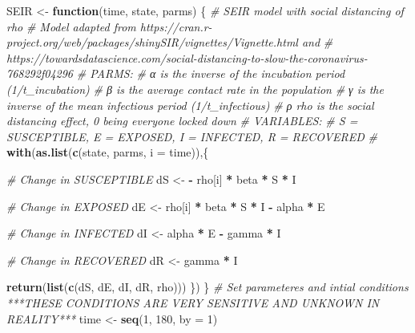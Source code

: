 \documentclass[]{article}
\newenvironment{Shaded}{\begin{snugshade}}{\end{snugshade}}
\newcommand{\KeywordTok}[1]{\textcolor[rgb]{0.13,0.29,0.53}{\textbf{#1}}}
\newcommand{\DataTypeTok}[1]{\textcolor[rgb]{0.13,0.29,0.53}{#1}}
\newcommand{\DecValTok}[1]{\textcolor[rgb]{0.00,0.00,0.81}{#1}}
\newcommand{\StringTok}[1]{\textcolor[rgb]{0.31,0.60,0.02}{#1}}
\newcommand{\CommentTok}[1]{\textcolor[rgb]{0.56,0.35,0.01}{\textit{#1}}}
\newcommand{\ControlFlowTok}[1]{\textcolor[rgb]{0.13,0.29,0.53}{\textbf{#1}}}
\newcommand{\OperatorTok}[1]{\textcolor[rgb]{0.81,0.36,0.00}{\textbf{#1}}}
\newcommand{\NormalTok}[1]{#1}
\begin{document}
\begin{Shaded}
\begin{Highlighting}[]
\NormalTok{SEIR <-}\StringTok{ }\ControlFlowTok{function}\NormalTok{(time, state, parms) \{}
  \CommentTok{# SEIR model with social distancing of rho}
  \CommentTok{# Model adapted from https://cran.r-project.org/web/packages/shinySIR/vignettes/Vignette.html and}
  \CommentTok{# https://towardsdatascience.com/social-distancing-to-slow-the-coronavirus-768292f04296}
  \CommentTok{# PARMS:}
  \CommentTok{# α is the inverse of the incubation period (1/t_incubation)}
  \CommentTok{# β is the average contact rate in the population}
  \CommentTok{# γ is the inverse of the mean infectious period (1/t_infectious)}
  \CommentTok{# ρ rho is the social distancing effect, 0 being everyone locked down}
  \CommentTok{# VARIABLES:}
  \CommentTok{# S = SUSCEPTIBLE, E = EXPOSED, I = INFECTED, R = RECOVERED}
  \CommentTok{# }
    \KeywordTok{with}\NormalTok{(}\KeywordTok{as.list}\NormalTok{(}\KeywordTok{c}\NormalTok{(state, parms, }\DataTypeTok{i =}\NormalTok{ time)),\{}
      
        \CommentTok{# Change in SUSCEPTIBLE}
\NormalTok{        dS <-}\StringTok{ }\OperatorTok{-}\StringTok{ }\NormalTok{rho[i] }\OperatorTok{*}\StringTok{ }\NormalTok{beta }\OperatorTok{*}\StringTok{ }\NormalTok{S }\OperatorTok{*}\StringTok{ }\NormalTok{I }
        
        \CommentTok{# Change in EXPOSED}
\NormalTok{        dE <-}\StringTok{ }\NormalTok{rho[i] }\OperatorTok{*}\StringTok{ }\NormalTok{beta }\OperatorTok{*}\StringTok{ }\NormalTok{S }\OperatorTok{*}\StringTok{ }\NormalTok{I }\OperatorTok{-}\StringTok{ }\NormalTok{alpha }\OperatorTok{*}\StringTok{ }\NormalTok{E}
        
        \CommentTok{# Change in INFECTED}
\NormalTok{        dI <-}\StringTok{ }\NormalTok{alpha }\OperatorTok{*}\StringTok{ }\NormalTok{E }\OperatorTok{-}\StringTok{ }\NormalTok{gamma }\OperatorTok{*}\StringTok{ }\NormalTok{I}
        
        \CommentTok{# Change in RECOVERED}
\NormalTok{        dR <-}\StringTok{ }\NormalTok{gamma }\OperatorTok{*}\StringTok{ }\NormalTok{I }
        
    \KeywordTok{return}\NormalTok{(}\KeywordTok{list}\NormalTok{(}\KeywordTok{c}\NormalTok{(dS, dE, dI, dR, rho)))}
\NormalTok{    \})}
\NormalTok{\}}
\CommentTok{# Set parameteres and intial conditions   ***THESE CONDITIONS ARE VERY SENSITIVE AND UNKNOWN IN REALITY***}
\NormalTok{time <-}\StringTok{ }\KeywordTok{seq}\NormalTok{(}\DecValTok{1}\NormalTok{, }\DecValTok{180}\NormalTok{, }\DataTypeTok{by =} \DecValTok{1}\NormalTok{)}


\end{Highlighting}
\end{Shaded}
\end{document}
